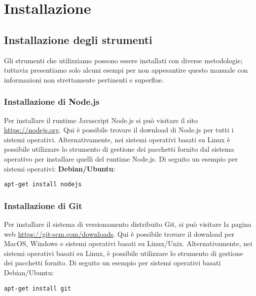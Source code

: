 \section{Installazione}
\subsection{Installazione degli strumenti}
Gli strumenti che utilizziamo possono essere installati con diverse metodologie; tuttavia presentiamo solo alcuni esempi per non appesantire questo manuale con informazioni non strettamente pertinenti e superflue.
\subsubsection{Installazione di Node.js}
Per installare il runtime Javascript Node.js si può visitare il sito \url{https://nodejs.org}. Qui è possibile trovare il download di Node.js per tutti i sistemi operativi. Alternativamente, nei sistemi operativi basati su Linux è possibile utilizzare lo strumento di gestione dei pacchetti fornito dal sistema operativo per installare quelli del runtime Node.js.
Di seguito un esempio per sistemi operativi: \textbf{Debian/Ubuntu}:
\begin{verbatim}
apt-get install nodejs
\end{verbatim}

\subsubsection{Installazione di Git}
Per installare il sistema di versionamento distribuito Git, si può visitare la pagina web \url{https://git-scm.com/downloads}. Qui è possibile trovare il download per MacOS, Windows e sistemi operativi basati su Linux/Unix. Alternativamente, nei sistemi operativi basati su Linux, è possibile utilizzare lo strumento di gestione dei pacchetti fornito. Di seguito un esempio per sistemi operativi basati Debian/Ubuntu:
\begin{verbatim}
apt-get install git
\end{verbatim}